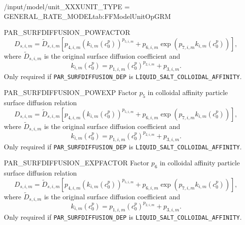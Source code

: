 \begin{condsubgroup}{/input/model/unit\_XXX}{UNIT\_TYPE = GENERAL\_RATE\_MODEL}{tab:FFModelUnitOpGRM}
\begin{dataset}[unit=--,type=double,range={$\mathds{R}$},length={\texttt{NBND}}]{PAR\_SURFDIFFUSION\_POWFACTOR}
    \begin{equation*}
      D_{s,i,m} = \tilde{D}_{s,i,m} \left[ p_{4,i,m} \left(k_{i,m}\left(c^p_0\right)\right)^{p_{5,i,m}} + p_{6,i,m} \exp\left( p_{7,i,m} k_{i,m}\left( c^p_0 \right) \right) \right],
    \end{equation*}
    where $\tilde{D}_{s,i,m}$ is the original surface diffusion coefficient and
    \begin{equation*}
      k_{i,m}( c^p_0 ) = p_{1,i,m} \left(c^p_0\right)^{p_{2,i,m}} + p_{3,i,m}.
    \end{equation*}
    Only required if \texttt{PAR\_SURFDIFFUSION\_DEP} is \texttt{LIQUID\_SALT\_COLLOIDAL\_AFFINITY}.
  \end{dataset}
  \begin{dataset}[unit=--,type=double,range={$\mathds{R}$},length={\texttt{NBND}}]{PAR\_SURFDIFFUSION\_POWEXP}
    Factor $p_5$ in colloidal affinity particle surface diffusion relation
    \begin{equation*}
      D_{s,i,m} = \tilde{D}_{s,i,m} \left[ p_{4,i,m} \left(k_{i,m}\left(c^p_0\right)\right)^{p_{5,i,m}} + p_{6,i,m} \exp\left( p_{7,i,m} k_{i,m}\left( c^p_0 \right) \right) \right],
    \end{equation*}
    where $\tilde{D}_{s,i,m}$ is the original surface diffusion coefficient and
    \begin{equation*}
      k_{i,m}( c^p_0 ) = p_{1,i,m} \left(c^p_0\right)^{p_{2,i,m}} + p_{3,i,m}.
    \end{equation*}
    Only required if \texttt{PAR\_SURFDIFFUSION\_DEP} is \texttt{LIQUID\_SALT\_COLLOIDAL\_AFFINITY}.
  \end{dataset}
  \begin{dataset}[unit=--,type=double,range={$\mathds{R}$},length={\texttt{NBND}}]{PAR\_SURFDIFFUSION\_EXPFACTOR}
    Factor $p_6$ in colloidal affinity particle surface diffusion relation
    \begin{equation*}
      D_{s,i,m} = \tilde{D}_{s,i,m} \left[ p_{4,i,m} \left(k_{i,m}\left(c^p_0\right)\right)^{p_{5,i,m}} + p_{6,i,m} \exp\left( p_{7,i,m} k_{i,m}\left( c^p_0 \right) \right) \right],
    \end{equation*}
    where $\tilde{D}_{s,i,m}$ is the original surface diffusion coefficient and
    \begin{equation*}
      k_{i,m}( c^p_0 ) = p_{1,i,m} \left(c^p_0\right)^{p_{2,i,m}} + p_{3,i,m}.
    \end{equation*}
    Only required if \texttt{PAR\_SURFDIFFUSION\_DEP} is \texttt{LIQUID\_SALT\_COLLOIDAL\_AFFINITY}.

\end{dataset}
\end{condsubgroup}
